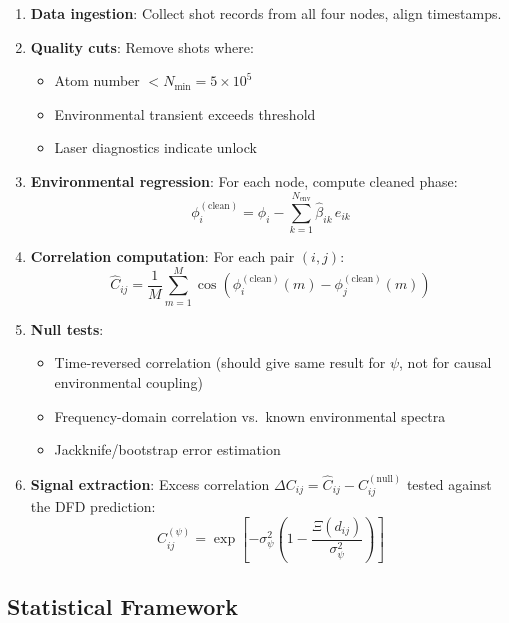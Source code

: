 \documentclass[12pt,a4paper]{article}
\begin{document}
\begin{enumerate}
\item \textbf{Data ingestion}: Collect shot records from all four nodes,
align timestamps.

\item \textbf{Quality cuts}: Remove shots where:
\begin{itemize}
\item Atom number $< N_{\min} = 5 \times 10^5$
\item Environmental transient exceeds threshold
\item Laser diagnostics indicate unlock
\end{itemize}

\item \textbf{Environmental regression}: For each node, compute cleaned
phase:
\begin{equation}
\phi_i^{(\text{clean})} = \phi_i - \sum_{k=1}^{N_{\text{env}}} \hat{\beta}_{ik}\,e_{ik}
\end{equation}

\item \textbf{Correlation computation}: For each pair $(i,j)$:
\begin{equation}
\hat{C}_{ij} = \frac{1}{M}\sum_{m=1}^{M}\cos\!\left(\phi_i^{(\text{clean})}(m) - \phi_j^{(\text{clean})}(m)\right)
\end{equation}

\item \textbf{Null tests}:
\begin{itemize}
\item Time-reversed correlation (should give same result for $\psi$, not for causal environmental coupling)
\item Frequency-domain correlation vs.\ known environmental spectra
\item Jackknife/bootstrap error estimation
\end{itemize}

\item \textbf{Signal extraction}: Excess correlation
$\Delta C_{ij} = \hat{C}_{ij} - C_{ij}^{(\text{null})}$ tested against
the DFD prediction:
\begin{equation}
C_{ij}^{(\psi)} = \exp\!\left[-\sigma_\psi^2\!\left(1 - \frac{\Xi(d_{ij})}{\sigma_\psi^2}\right)\right]
\end{equation}
\end{enumerate}

\subsection{Statistical Framework}
\end{document}
